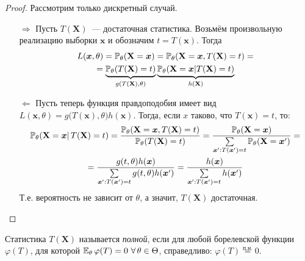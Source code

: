 \begin{proof}
    Рассмотрим только дискретный случай. 
    \begin{enumerate}
        \item[$\Rightarrow$] Пусть $T(\mathbf{X})$~--- достаточная статистика. 
            Возьмём произвольную реализацию выборки $\boldsymbol{x}$ и обозначим $t = T(\boldsymbol{x})$. Тогда
            \begin{multline*}
                L(\boldsymbol{x}, \theta) = \mathbb{P}_{\theta} (\mathbf{X}=\boldsymbol{x})=\mathbb{P}_{\theta} (\mathbf{X}=\boldsymbol{x}, T(\mathbf{X})=t) =\\
                = \underbrace{\mathbb{P}_{\theta} (T(\mathbf{X})=t)}_{g(T(\mathbf{X}), \theta)} \underbrace{\mathbb{P}_{\theta} (\mathbf{X}=\boldsymbol{x} | T(\mathbf{X})=t)}_{h(\mathbf{X})}
            \end{multline*}
        \item[$\Leftarrow$] Пусть теперь функция правдоподобия имеет вид $L(\boldsymbol{x}, \theta)=g\bigl(T(\boldsymbol{x}), \theta\bigr) h(\boldsymbol{x})$. 
            Тогда, если $x$ таково, что $T(\boldsymbol{x})=t$, то:
            \begin{multline*}
                \mathbb{P}_{\theta} (\mathbf{X}=\boldsymbol{x} | \, T(\mathbf{X})=t) =\frac{\mathbb{P}_{\theta} (\mathbf{X}=\boldsymbol{x}, T(\mathbf{X})=t)}{\mathbb{P}_{\theta} (T(\mathbf{X})=t)}
                =\frac{\mathbb{P}_{\theta} (\mathbf{X}=\boldsymbol{x})}{\sum\limits_{\boldsymbol{x}^{\prime}: T(\boldsymbol{x}^{\prime})=t} \mathbb{P}_{\theta}(\mathbf{X}=\boldsymbol{x}^{\prime})} = \\
                = \frac{g(t, \theta) h(\boldsymbol{x})}{\sum\limits_{\boldsymbol{x}^{\prime}: T(\boldsymbol{x}^{\prime})=t} g(t, \theta) h(\boldsymbol{x}^{\prime})}
                = \frac{h(\boldsymbol{x})}{\sum\limits_{\boldsymbol{x}^{\prime}: T(\boldsymbol{x}^{\prime})=t} h(\boldsymbol{x}^{\prime})}
            \end{multline*}
            Т.е. вероятность не зависит от $\theta$, а значит, $T(\mathbf{X})$ достаточная.
    \end{enumerate}
\end{proof}

\begin{defn}
    Статистика $T(\mathbf{X})$ называется \textit{полной}, если для любой борелевской функции $\varphi(T)$, для которой $\mathbb{E}_{\theta}\, \varphi(T)=0~\forall \, \theta \in \Theta$, справедливо: $\varphi(T) \stackrel{\text{п.н.}}{=}0$.
\end{defn}

